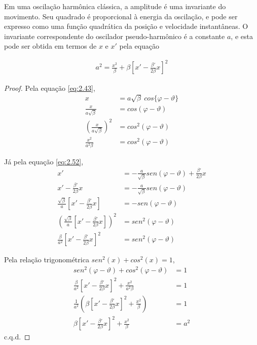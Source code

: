 Em uma oscilação harmônica clássica, a amplitude é uma invariante do movimento. Seu quadrado é proporcional à energia da oscilação, e pode ser expresso como uma função quadrática da posição e velocidade instantâneas. O invariante correspondente do oscilador pseudo-harmônico é a constante $a$, e esta pode ser obtida em termos de $x$ e $x'$ pela equação
	
\begin{align}
	a^2 = \frac{x^2}{\beta} + \beta\left[x'-\frac{\beta'}{2\beta}x\right]^2\label{eq:2.56}
\end{align}
	
\begin{proof}
	Pela equação \eqref{eq:2.43},
	\begin{align*}
        x &= a\sqrt{\beta}\ cos\{\varphi-\vartheta\}\\
        \frac{x}{a\sqrt{\beta}} &= cos(\varphi-\vartheta)\\
        \left(\frac{x}{a\sqrt{\beta}}\right)^2 &= cos^2(\varphi-\vartheta)\\
        \frac{x^2}{a^2\beta} &= cos^2(\varphi-\vartheta)
	\end{align*}
	
	Já pela equação \eqref{eq:2.52},
	\begin{align*}
        x' &= - \frac{a}{\sqrt{\beta}}sen(\varphi-\vartheta)+\frac{\beta'}{2\beta}x\\
        x' - \frac{\beta'}{2\beta}x&= - \frac{a}{\sqrt{\beta}}sen(\varphi-\vartheta)\\
        \frac{\sqrt{\beta}}{a}\left[x' - \frac{\beta'}{2\beta}x\right]&= -sen(\varphi-\vartheta)\\
        \left(\frac{\sqrt{\beta}}{a}\left[x' - \frac{\beta'}{2\beta}x\right]\right)^2&= sen^2(\varphi-\vartheta)\\
        \frac{\beta}{a^2}\left[x' - \frac{\beta'}{2\beta}x\right]^2&= sen^2(\varphi-\vartheta)
	\end{align*}
	
	Pela relação trigonométrica $sen^2(x)+cos^2(x)=1$,
	\begin{align*}
        sen^2(\varphi-\vartheta)+cos^2(\varphi-\vartheta)&=1\\
        \frac{\beta}{a^2}\left[x' - \frac{\beta'}{2\beta}x\right]^2 + \frac{x^2}{a^2\beta} &= 1\\
        \frac{1}{a^2}\left(\beta\left[x' - \frac{\beta'}{2\beta}x\right]^2 + \frac{x^2}{\beta}\right) &= 1\\
        \beta\left[x' - \frac{\beta'}{2\beta}x\right]^2 + \frac{x^2}{\beta} &= a^2
	\end{align*}
	c.q.d.
\end{proof}
	
